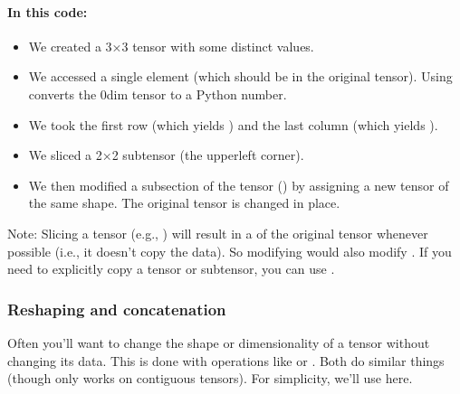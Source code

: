 \documentclass[letterpaper,10pt,english]{jupyterBook}
\begin{document}
\paragraph{In this code:}
\label{\detokenize{04:in-this-code}}\begin{itemize}
\item {} 
\sphinxAtStartPar
We created a 3×3 tensor  with some distinct values.

\item {} 
\sphinxAtStartPar
We accessed a single element  (which should be  in the original tensor). Using  converts the 0\sphinxhyphen{}dim tensor to a Python number.

\item {} 
\sphinxAtStartPar
We took the first row  (which yields \sphinxcode{\sphinxupquote{{[}10, 11, 12{]}}}) and the last column  (which yields \sphinxcode{\sphinxupquote{{[}12, 22, 32{]}}}).

\item {} 
\sphinxAtStartPar
We sliced a 2×2 sub\sphinxhyphen{}tensor (the upper\sphinxhyphen{}left corner).

\item {} 
\sphinxAtStartPar
We then modified a sub\sphinxhyphen{}section of the tensor () by assigning a new tensor of the same shape. The original tensor  is changed in place.

\end{itemize}

\sphinxAtStartPar
Note: Slicing a tensor (e.g., ) will result in a  of the original tensor whenever possible (i.e., it doesn’t copy the data). So modifying  would also modify . If you need to explicitly copy a tensor or sub\sphinxhyphen{}tensor, you can use .


\subsubsection{Reshaping and concatenation}
\label{\detokenize{04:reshaping-and-concatenation}}
\sphinxAtStartPar
Often you’ll want to change the shape or dimensionality of a tensor without changing its data. This is done with operations like  or . Both do similar things (though  only works on contiguous tensors). For simplicity, we’ll use  here.
\end{document}
